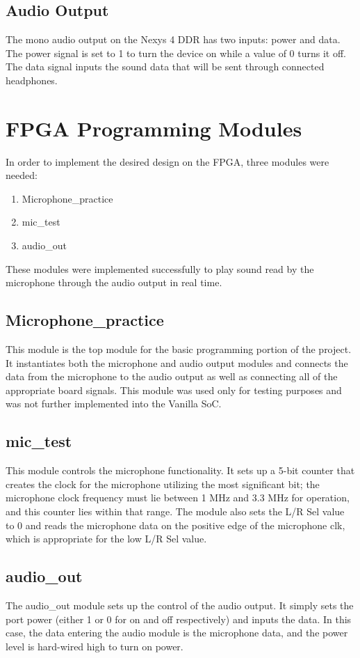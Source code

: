 \documentclass{article}
\begin{document}
\subsection{Audio Output}
The mono audio output on the Nexys 4 DDR has two inputs: power and data. The power signal is set to 1 to turn the device on while a value of 0 turns it off. The data signal inputs the sound data that will be sent through connected headphones.

\section{FPGA Programming Modules}
In order to implement the desired design on the FPGA, three modules were needed:

\begin{enumerate}
	\item Microphone\_practice
	\item mic\_test
	\item audio\_out
\end{enumerate}

These modules were implemented successfully to play sound read by the microphone through the audio output in real time.
	
\subsection{Microphone\_practice}
This module is the top module for the basic programming portion of the project. It instantiates both the microphone and audio output modules and connects the data from the microphone to the audio output as well as connecting all of the appropriate board signals. This module was used only for testing purposes and was not further implemented into the Vanilla SoC.

\subsection{mic\_test}
This module controls the microphone functionality. It sets up a 5-bit counter that creates the clock for the microphone utilizing the most significant bit; the microphone clock frequency must lie between 1 MHz and 3.3 MHz for operation, and this counter lies within that range. The module also sets the L/R Sel value to 0 and reads the microphone data on the positive edge of the microphone clk, which is appropriate for the low L/R Sel value. 

\subsection{audio\_out}
The audio\_out module sets up the control of the audio output. It simply sets the port power (either 1 or 0 for on and off respectively) and inputs the data. In this case, the data entering the audio module is the microphone data, and the power level is hard-wired high to turn on power.
\end{document}
